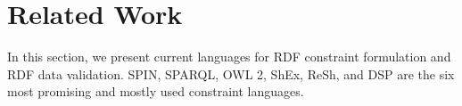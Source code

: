 \documentclass[a4paper,fontsize=11pt]{scrartcl}
\newenvironment{DL}{
  \vspace{0cm}
	\begin{center}
  \begin{tabular}{r l}

}{
  \end{tabular}
	\end{center}
}
\begin{document}

%
%
%



\section{Related Work}

In this section, we present current languages for RDF constraint formulation and RDF data validation. SPIN, SPARQL, OWL 2, ShEx, ReSh, and DSP are the six most promising and mostly used constraint languages.
\end{document}
